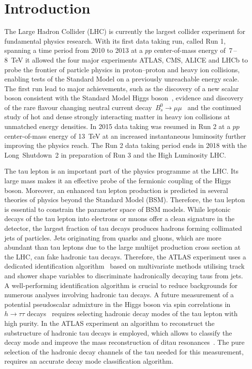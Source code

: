\chapter*{Introduction}
\label{sec:intro}

The Large Hadron Collider (LHC) is currently the largest collider experiment for
fundamental physics research. With its first data taking run, called Run 1,
spanning a time period from 2010 to 2013 at a $pp$ center-of-mass energy
of~\num{7}\,--\,\SI{8}{\TeV} it allowed the four major experiments ATLAS, CMS,
ALICE and LHCb to probe the frontier of particle physics in proton--proton and
heavy ion collisions, enabling tests of the Standard Model on a previously
unreachable energy scale. The first run lead to major achievements, such as the
discovery of a new scalar boson consistent with the Standard Model Higgs
boson~\cite{higgs_atlas, higgs_cms}, evidence and discovery of the rare flavour
changing neutral current decay~$B_s^0 \to \mu \mu$~\cite{lhcb_bs_mumu,
  cms_bs_mumu} and the continued study of hot and dense strongly interacting
matter in heavy ion collisions at unmatched energy densities. In 2015 data
taking was resumed in Run 2 at a $pp$ center-of-mass energy of \SI{13}{\TeV} at
an increased instantaneous luminosity further improving the physics reach. The
Run 2 data taking period ends in 2018 with the Long~Shutdown~2 in preparation of
Run 3 and the High Luminosity LHC.

The tau lepton is an important part of the physics programme at the LHC. Its
large mass makes it an effective probe of the fermionic coupling of the Higgs
boson. Moreover, an enhanced tau lepton production is predicted in several
theories of physics beyond the Standard Model (BSM). Therefore, the tau lepton
is essential to constrain the parameter space of BSM models. While leptonic
decays of the tau lepton into electrons or muons offer a clean signature in the
detector, the largest fraction of tau decays produces hadrons forming collimated
jets of particles. Jets originating from quarks and gluons, which are more
abundant than tau leptons due to the large multijet production cross section at
the LHC, can fake hadronic tau decays. Therefore, the ATLAS experiment uses a
dedicated identification algorithm~\cite{atlas:taurec:run1, atlas:taurec:run2}
based on multivariate methods utilising track and shower shape variables to
discriminate hadronically decaying taus from jets. A well-performing
identification algorithm is crucial to reduce backgrounds for numerous analyses
involving hadronic tau decays. A future measurement of a potential pseudoscalar
admixture in the Higgs boson via spin correlations in $h \to \tau\tau$
decays~\cite{desch_higgs_cp, harnik, Berge2014} requires selecting hadronic
decay modes of the tau lepton with high purity. In the ATLAS experiment an
algorithm to reconstruct the substructure of hadronic tau decays is employed,
which allows to classify the decay mode and improve the mass reconstruction of
ditau resonances~\cite{atlas:taurec:decaymodes}. The pure selection of the
hadronic decay channels of the tau needed for this measurement, requires an
accurate decay mode classification algorithm.

